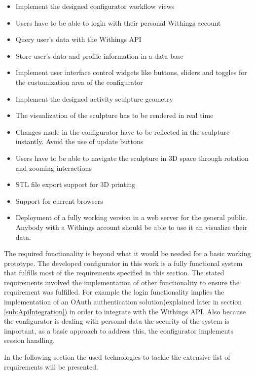 \documentclass[../medieninformatik-arbeit.tex]{subfiles}
\begin{document}
\begin{itemize}
	\item Implement the designed configurator workflow views
	\item Users have to be able to login with their personal Withings account
	\item Query user's data with the Withings API
	\item Store user's data and profile information in a data base
	\item Implement user interface control widgets like buttons, sliders and toggles for the customization area of the configurator
	\item Implement the designed activity sculpture geometry
	\item The visualization of the sculpture has to be rendered in real time  
	\item Changes made in the configurator have to be reflected in the sculpture instantly. Avoid the use of update buttons 
	\item Users have to be able to navigate the sculpture in 3D space through rotation and zooming interactions
	\item STL file export support for 3D printing
	\item Support for current browsers
	\item Deployment of a fully working version in a web server for the general public. Anybody with a Withings account should be able to use it an visualize their data.
\end{itemize}


The required functionality is beyond what it would be needed for a basic working prototype. The developed configurator in this work is a fully functional system that fulfills most of the requirements specified in this section. The stated requirements involved the implementation of other functionality to ensure the requirement was fulfilled. For example the login functionality implies the implementation of an OAuth authentication solution(explained later in section \ref{sub:ApiIntegration}) in order to integrate with the Withings API. Also because the configurator is dealing with personal data the security of the system is important, as a basic approach to address this, the configurator implements session handling.

In the following section the used technologies to tackle the extensive list of requirements will be presented.  
\end{document}
